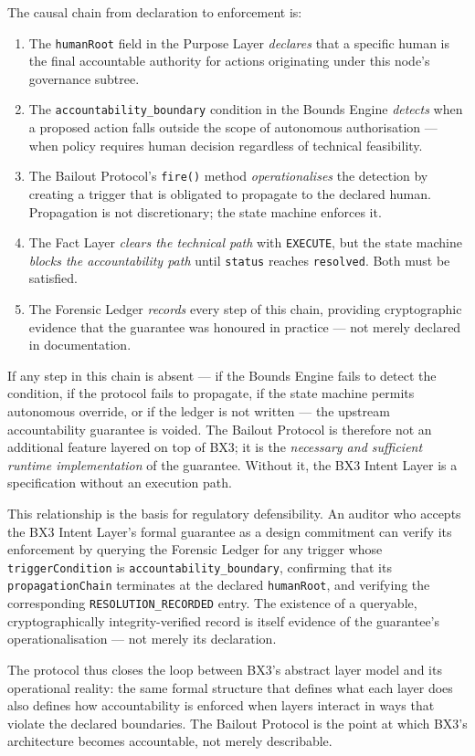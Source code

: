The causal chain from declaration to enforcement is:

\begin{enumerate}
  \item The \texttt{humanRoot} field in the Purpose Layer \emph{declares} that a
        specific human is the final accountable authority for actions originating
        under this node's governance subtree.
  \item The \texttt{accountability\_boundary} condition in the Bounds Engine
        \emph{detects} when a proposed action falls outside the scope of
        autonomous authorisation --- when policy requires human decision regardless
        of technical feasibility.
  \item The Bailout Protocol's \texttt{fire()} method \emph{operationalises} the
        detection by creating a trigger that is obligated to propagate to the
        declared human.  Propagation is not discretionary; the state machine
        enforces it.
  \item The Fact Layer \emph{clears the technical path} with \texttt{EXECUTE},
        but the state machine \emph{blocks the accountability path} until
        \texttt{status} reaches \texttt{resolved}.  Both must be satisfied.
  \item The Forensic Ledger \emph{records} every step of this chain, providing
        cryptographic evidence that the guarantee was honoured in practice ---
        not merely declared in documentation.
\end{enumerate}

If any step in this chain is absent --- if the Bounds Engine fails to detect
the condition, if the protocol fails to propagate, if the state machine permits
autonomous override, or if the ledger is not written --- the upstream
accountability guarantee is voided.  The Bailout Protocol is therefore not an
additional feature layered on top of BX3; it is the \emph{necessary and sufficient
runtime implementation} of the guarantee.  Without it, the BX3 Intent Layer
is a specification without an execution path.

This relationship is the basis for regulatory defensibility.  An auditor who
accepts the BX3 Intent Layer's formal guarantee as a design commitment can
verify its enforcement by querying the Forensic Ledger for any trigger whose
\texttt{triggerCondition} is \texttt{accountability\_boundary}, confirming that
its \texttt{propagationChain} terminates at the declared \texttt{humanRoot}, and
verifying the corresponding \texttt{RESOLUTION\_RECORDED} entry.  The existence
of a queryable, cryptographically integrity-verified record is itself evidence
of the guarantee's operationalisation --- not merely its declaration.

The protocol thus closes the loop between BX3's abstract layer model and its
operational reality: the same formal structure that defines what each layer does
also defines how accountability is enforced when layers interact in ways that
violate the declared boundaries.  The Bailout Protocol is the point at which
BX3's architecture becomes accountable, not merely describable.

